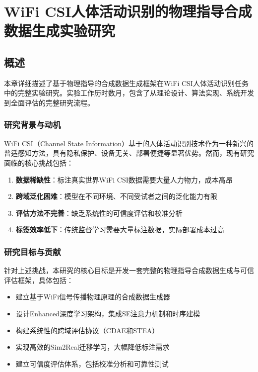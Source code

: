 
\chapter{WiFi CSI人体活动识别的物理指导合成数据生成实验研究}
\label{chap:experiments}

\section{概述}
\label{sec:overview}

本章详细描述了基于物理指导的合成数据生成框架在WiFi CSI人体活动识别任务中的完整实验研究。实验工作历时数月，包含了从理论设计、算法实现、系统开发到全面评估的完整研究流程。

\subsection{研究背景与动机}
\label{subsec:motivation}

WiFi CSI（Channel State Information）基于的人体活动识别技术作为一种新兴的普适感知方法，具有隐私保护、设备无关、部署便捷等显著优势。然而，现有研究面临的核心挑战包括：

\begin{enumerate}
\item \textbf{数据稀缺性}：标注真实世界WiFi CSI数据需要大量人力物力，成本高昂
\item \textbf{跨域泛化困难}：模型在不同环境、不同受试者之间的泛化能力有限  
\item \textbf{评估方法不完善}：缺乏系统性的可信度评估和校准分析
\item \textbf{标签效率低下}：传统监督学习需要大量标注数据，实际部署成本过高
\end{enumerate}

\subsection{研究目标与贡献}
\label{subsec:objectives}

针对上述挑战，本研究的核心目标是开发一套完整的物理指导合成数据生成与可信评估框架，具体包括：

\begin{itemize}
\item 建立基于WiFi信号传播物理原理的合成数据生成器
\item 设计Enhanced深度学习架构，集成SE注意力机制和时序建模
\item 构建系统性的跨域评估协议（CDAE和STEA）
\item 实现高效的Sim2Real迁移学习，大幅降低标注需求
\item 建立可信度评估体系，包括校准分析和可靠性测试
\end{itemize}

